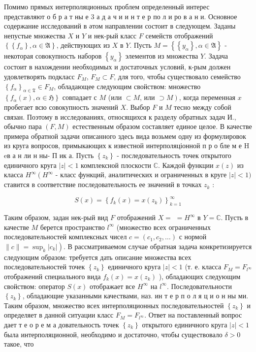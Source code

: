 \documentclass[10pt]{article}
\begin{document}
Помимо прямых интерполяционных проблем определенный интерес представляют о б р а т ны е 3 а д а ч и и н т е р по л и ро в а н и. Основное содержание исследований в әтом направлении состоит в следующем. Заданы непустые множества $X$ и $Y$ и нек-рый класс $F$ семейств отображений $\left\{\left\{f_{\alpha}\right\}, \alpha \in \mathfrak{A}\right\}$, действующих из $X$ в $Y$. Пусть $M=\left\{\left\{y_{\alpha}\right\}, \alpha \in \mathfrak{A}\right\}$ - некоторая совокупность наборов $\left\{y_{\alpha}\right\}$ элементов из множества $Y$. Задача состоит в нахождении необходимых и достаточных условий, к-рым должен удовлетворять подкласс $F_{M}$, $F_{M} \subset F$, для того, чтобы существовало семейство $\left\{f_{\alpha}\right\}_{\alpha \in \mathfrak{T}} \in F_{M}$, обладающее следующим свойством: множество $\left\{f_{\alpha}(x), \alpha \in \mathfrak{H}\right\}$ совпадает с $M$ (или $\subset M$, или $\left.\supset M\right)$, когда переменная $x$ пробегает всю совокупность значений $X$. Выбор $F$ и $M$ тесно между собой связан. Поэтому в исследованиях, относящихся к разделу обратных задач И., обычно пара $(F, M)$ естественным образом составляет единое целое. В качестве примера обратной задачи описанного здесь вида возьмем одну из формулировок из круга вопросов, примыкающих к известной интерполяціонной п р о бле м е H eв а н ли н ны- П ик а. Пусть $\left\{z_{k}\right\}$ - последовательность точек открытого единичного круга $|z|<1$ комплексной плоскости $\mathbb{C}$. Каждой функции $x(z)$ из класса $H^{\infty}\left(H^{\infty}\right.$ - класс функций, аналитических и ограниченных в круге $|z|<1)$ ставится в соответствие последовательность ее значений в точках $z_{k}$ :



\[

S(x)=\left\{f_{k}(x)=x\left(z_{k}\right)\right\}_{k=1}^{\infty}

\]



Таким образом, задан нек-рый вид $F$ отображений $X=$ $=H^{\infty}$ в $Y=\mathbb{C}$. Пусть в качестве $M$ берется пространство $l^{\infty}$ (множество всех ограниченных последовательностей комплексных чисел $c=\left(c_{1}, c_{2}, \ldots\right)$ с нормой $\left.\|c\|=\sup _{k}\left|c_{k}\right|\right)$. В рассматриваемом случае обратная задача конкретизируется следующим образом: требуется дать описание множества всех последовательностей точек $\left\{z_{k}\right\}$ единичного круга $|z|<1$ (т. е. класса $F_{M}=F_{l^{\infty}}$ отображений специального вида $f_{k}(x)=x\left(z_{k}\right)$ ), обладающих следующим свойством: оператор $S(x)$ отображает все $H^{\infty}$ на $l^{\infty}$. Последовательности $\left\{z_{k}\right\}$, обладающие указанными качествами, наз. ин т е р п о л я ц и о н ны ми. Таким образом, множество всех интерполяционных последовательностей $\left\{z_{k}\right\}$ и определяет в данной ситуации класс $F_{M}=F_{l^{\infty}}$. Ответ на поставленный вопрос дает т е о р е м а довательность точек $\left\{z_{k}\right\}$ открытого единичного круга $|z|<1$ была интерполяционной, необходимо и достаточно, чтобы существовало $\delta>0$ такое, что
\end{document}
